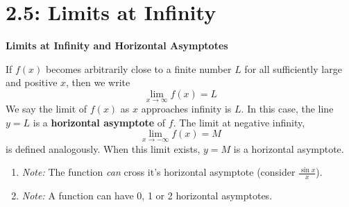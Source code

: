 \documentclass[mathNotesPreamble]{subfiles}
\begin{document}
\section{2.5: Limits at Infinity} 
      \begin{defn*}
        \textbf{Limits at Infinity and Horizontal Asymptotes} 

          If $f(x)$ becomes arbitrarily close to a finite number $L$ for all sufficiently large and positive $x$, then we write
            $$\lim_{x \to \infty} f(x)=L$$
          We say the limit of $f(x)$ as $x$ approaches infinity is $L$. In this case, the line $y=L$ is a \textbf{horizontal asymptote} of $f$. The limit at negative infinity, 
            $$\lim_{x \to -\infty} f(x)=M$$
          is defined analogously. When this limit exists, $y=M$ is a horizontal asymptote.
      \end{defn*}
      \begin{enumerate}[label=]
        \item\textit{Note:} The function \textit{can} cross it's horizontal asymptote (consider $\frac{\sin x}{x}$).
        \item\textit{Note:} A function can have 0, 1 or 2 horizontal asymptotes.
      \end{enumerate}
      
\end{document}
